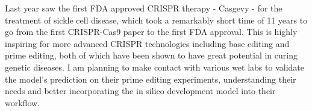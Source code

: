 Last year saw the first FDA approved CRISPR therapy - Casgevy - for the treatment of sickle cell disease, which took a remarkably short time of 11 years to go from the first CRISPR-Cas9 paper to the first FDA approval\cite{CRISPRClinicalTrials}. This is highly inspiring for more advanced CRISPR technologies including base editing and prime editing, both of which have been shown to have great potential in curing genetic diseases. I am planning to make contact with various wet labs to validate the model's prediction on their prime editing experiments, understanding their needs and better incorporating the in silico development model into their workflow. 
